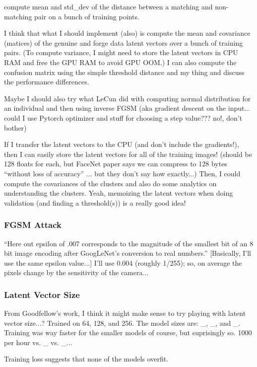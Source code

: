 compute mean and std\_dev of the distance between a matching and non-matching pair on a bunch of training points.

I think that what I should implement (also) is compute the mean and covariance (matices) of the genuine and forge data latent vectors over a bunch of training pairs. (To compute variance, I might need to store the latent vectors in CPU RAM and free the GPU RAM to avoid GPU OOM.)
I can also compute the confusion matrix using the simple threshold distance and my thing and discuss the performance differences.

Maybe I should also try what LeCun did with computing normal distribution for an individual and then using inverse FGSM (aka gradient descent on the input... could I use Pytorch optimizer and stuff for choosing a step value??? no!, don't bother)

If I transfer the latent vectors to the CPU (and don't include the gradients!), then I can easily store the latent vectors for all of the training images!
(should be 128 floats for each, but FaceNet paper says we can compress to 128 bytes ``without loss of accuracy'' ... but they don't say how exactly...)
Then, I could compute the covariances of the clusters and also do some analytics on understanding the clusters.
Yeah, memoizing the latent vectors when doing validation (and finding a threshold(s)) is a really good idea!

\subsubsection{FGSM Attack}
``Here out epsilon of .007 corresponds to the magnitude of the
smallest bit of an 8 bit image encoding after GoogLeNet's conversion to real numbers.''\cite{goodfellow}
[Basically, I'll use the same epsilon value...]
I'll use 0.004 (roughly 1/255); so, on average the pixels change by the sensitivity of the camera...

\subsubsection{Latent Vector Size}
From Goodfellow's work, I think it might make sense to try playing with latent vector size...?
Trained on 64, 128, and 256.
The model sizes are: \_, \_, and \_.
Training was way faster for the smaller models of course, but suprisingly so.
1000 per hour vs. \_ vs. \_...

Training loss suggests that none of the models overfit.

